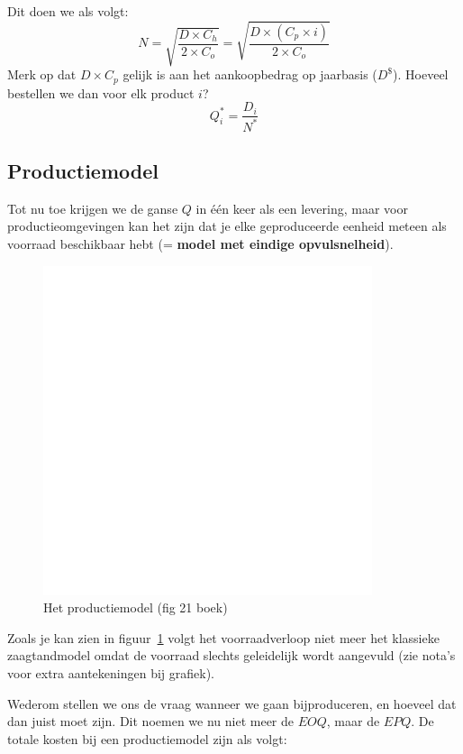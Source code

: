 Dit doen we als volgt:
\begin{equation}
    N = \sqrt{\frac{D \times C_h}{2 \times C_o}} = \sqrt{\frac{D \times (C_p \times i)}{2 \times C_o}}
\end{equation}
Merk op dat $D \times C_p$ gelijk is aan het aankoopbedrag op jaarbasis ($D^\$$). Hoeveel bestellen we dan voor elk product $i$?
\begin{equation}
    Q_i^* = \frac{D_i}{N^*}
\end{equation}


\subsection{Productiemodel}
Tot nu toe krijgen we de ganse $Q$ in \'e\'en keer als een levering, maar voor productieomgevingen kan het zijn dat je elke geproduceerde eenheid meteen als voorraad beschikbaar hebt (= \textbf{model met eindige opvulsnelheid}).

\begin{figure}[htbp]
    \centering
    \includegraphics[scale=0.4]{Images/white.png}
    \caption{Het productiemodel (fig 21 boek)}
    \label{fig:productiemodel}
\end{figure}
Zoals je kan zien in figuur~\ref{fig:productiemodel} volgt het voorraadverloop niet meer het klassieke zaagtandmodel omdat de voorraad slechts geleidelijk wordt aangevuld (zie nota's voor extra aantekeningen bij grafiek).

Wederom stellen we ons de vraag wanneer we gaan bijproduceren, en hoeveel dat dan juist moet zijn. Dit noemen we nu niet meer de $EOQ$, maar de $EPQ$. De totale kosten bij een productiemodel zijn als volgt:

